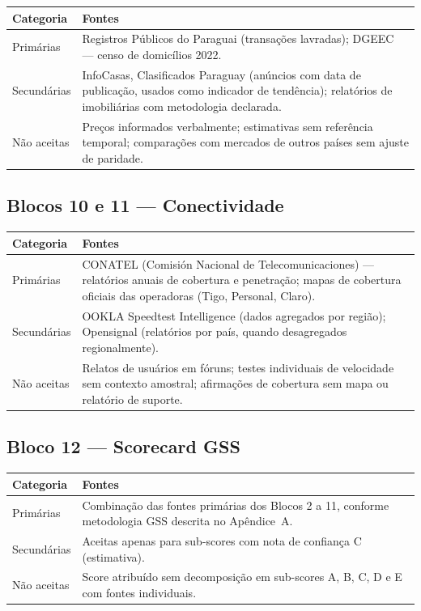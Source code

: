 \begin{tabularx}{\linewidth}{lX}
\toprule
\textbf{Categoria} & \textbf{Fontes} \\
\midrule
Primárias    & Registros Públicos do Paraguai (transações lavradas); DGEEC — censo de domicílios 2022. \\
Secundárias  & InfoCasas, Clasificados Paraguay (anúncios com data de publicação, usados como indicador de tendência); relatórios de imobiliárias com metodologia declarada. \\
Não aceitas  & Preços informados verbalmente; estimativas sem referência temporal; comparações com mercados de outros países sem ajuste de paridade. \\
\bottomrule
\end{tabularx}

\subsection*{Blocos 10 e 11 — Conectividade}

\begin{tabularx}{\linewidth}{lX}
\toprule
\textbf{Categoria} & \textbf{Fontes} \\
\midrule
Primárias    & CONATEL (Comisión Nacional de Telecomunicaciones) — relatórios anuais de cobertura e penetração; mapas de cobertura oficiais das operadoras (Tigo, Personal, Claro). \\
Secundárias  & OOKLA Speedtest Intelligence (dados agregados por região); Opensignal (relatórios por país, quando desagregados regionalmente). \\
Não aceitas  & Relatos de usuários em fóruns; testes individuais de velocidade sem contexto amostral; afirmações de cobertura sem mapa ou relatório de suporte. \\
\bottomrule
\end{tabularx}

\subsection*{Bloco 12 — Scorecard GSS}

\begin{tabularx}{\linewidth}{lX}
\toprule
\textbf{Categoria} & \textbf{Fontes} \\
\midrule
Primárias    & Combinação das fontes primárias dos Blocos 2 a 11, conforme metodologia GSS descrita no Apêndice~A. \\
Secundárias  & Aceitas apenas para sub-scores com nota de confiança C (estimativa). \\
Não aceitas  & Score atribuído sem decomposição em sub-scores A, B, C, D e E com fontes individuais. \\
\bottomrule
\end{tabularx}

